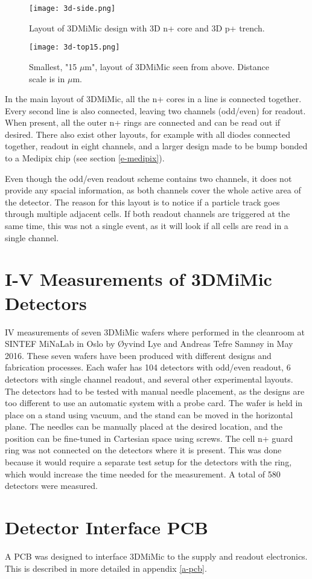 \documentclass[../main/thesis.tex]{subfiles}
\begin{document}
\begin{figure}%
	\centering
	\texttt{[image: 3d-side.png]}
	\caption{Layout of 3DMiMic design with 3D n+ core and 3D p+ trench. \citep{Marco}}
	\label{fig-3dmimic-side} %
\end{figure}

\begin{figure}%
	\centering
	\texttt{[image: 3d-top15.png]}
	\caption{Smallest, "15 $\mu$m", layout of 3DMiMic seen from above. Distance scale is in $\mu$m. \citep{Marco}}
	\label{fig-3dmimic-top15} %
\end{figure}

In the main layout of 3DMiMic, all the n+ cores in a line is connected together. Every second line is also connected, leaving two channels (odd/even) for readout. When present, all the outer n+ rings are connected and can be read out if desired. There also exist other layouts, for example with all diodes connected together, readout in eight channels, and a larger design made to be bump bonded to a Medipix chip (see section \ref{e-medipix}). 

Even though the odd/even readout scheme contains two channels, it does not provide any spacial information, as both channels cover the whole active area of the detector. The reason for this layout is to notice if a particle track goes through multiple adjacent cells. If both readout channels are triggered at the same time, this was not a single event, as it will look if all cells are read in a single channel.

\section{I-V Measurements of 3DMiMic Detectors}
\label{3d-IV}
\gls{IV} measurements of seven 3DMiMic wafers where performed in the cleanroom at SINTEF MiNaLab in Oslo by Øyvind Lye and Andreas Tefre Samnøy in May 2016. These seven wafers have been produced with different designs and fabrication processes. Each wafer has 104 detectors with odd/even readout, 6 detectors with single channel readout, and several other experimental layouts. The detectors had to be tested with manual needle placement, as the designs are too different to use an automatic system with a probe card. The wafer is held in place on a stand using vacuum, and the stand can be moved in the horizontal plane. The needles can be manually placed at the desired location, and the position can be fine-tuned in Cartesian space using screws. The cell n+ guard ring was not connected on the detectors where it is present. This was done because it would require a separate test setup for the detectors with the ring, which would increase the time needed for the measurement. A total of 580 detectors were measured. 

\section{Detector Interface PCB}
\label{3d-pcb}
A \gls{PCB} was designed to interface 3DMiMic to the supply and readout electronics. This is described in more detailed in appendix \ref{a-pcb}.
\end{document}

